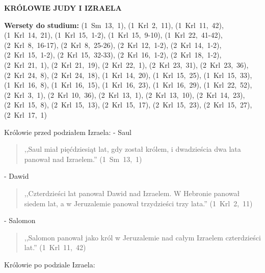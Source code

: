 \documentclass[10pt,a4paper,oneside]{article}
\begin{document}
\centerline{\textbf{\MakeUppercase{Królowie Judy i Izraela}}}
\begin{center}
\textbf{Wersety do studium:} \mbox{(1 Sm 13, 1)}, \mbox{(1 Krl 2, 11)}, \mbox{(1 Krl 11, 42)}, \mbox{(1 Krl 14, 21)}, \mbox{(1 Krl 15, 1-2)}, \mbox{(1 Krl 15, 9-10)}, \mbox{(1 Krl 22, 41-42)}, \mbox{(2 Krl 8, 16-17)}, \mbox{(2 Krl 8, 25-26)}, \mbox{(2 Krl 12, 1-2)}, \mbox{(2 Krl 14, 1-2)}, \mbox{(2 Krl 15, 1-2)}, \mbox{(2 Krl 15, 32-33)}, \mbox{(2 Krl 16, 1-2)}, \mbox{(2 Krl 18, 1-2)}, \mbox{(2 Krl 21, 1)}, \mbox{(2 Krl 21, 19)}, \mbox{(2 Krl 22, 1)}, \mbox{(2 Krl 23, 31)}, \mbox{(2 Krl 23, 36)}, \mbox{(2 Krl 24, 8)}, \mbox{(2 Krl 24, 18)}, \mbox{(1 Krl 14, 20)}, \mbox{(1 Krl 15, 25)}, \mbox{(1 Krl 15, 33)}, \mbox{(1 Krl 16, 8)}, \mbox{(1 Krl 16, 15)}, \mbox{(1 Krl 16, 23)}, \mbox{(1 Krl 16, 29)}, \mbox{(1 Krl 22, 52)}, \mbox{(2 Krl 3, 1)}, \mbox{(2 Krl 10, 36)}, \mbox{(2 Krl 13, 1)}, \mbox{(2 Krl 13, 10)}, \mbox{(2 Krl 14, 23)}, \mbox{(2 Krl 15, 8)}, \mbox{(2 Krl 15, 13)}, \mbox{(2 Krl 15, 17)}, \mbox{(2 Krl 15, 23)}, \mbox{(2 Krl 15, 27)}, \mbox{(2 Krl 17, 1)}
\end{center}
Królowie przed podziałem Izraela:
- Saul
\begin{quote}
,,Saul miał pięćdziesiąt lat, gdy został królem, i dwadzieścia dwa lata panował nad Izraelem.'' \mbox{(1 Sm 13, 1)}
\end{quote}
- Dawid
\begin{quote}
,,Czterdzieści lat panował Dawid nad Izraelem. W Hebronie panował siedem lat, a w Jeruzalemie panował trzydzieści trzy lata.'' \mbox{(1 Krl 2, 11)}
\end{quote}
- Salomon
\begin{quote}
,,Salomon panował jako król w Jeruzalemie nad całym Izraelem czterdzieści lat.'' \mbox{(1 Krl 11, 42)}
\end{quote}

Królowie po podziale Izraela:
\end{document}
